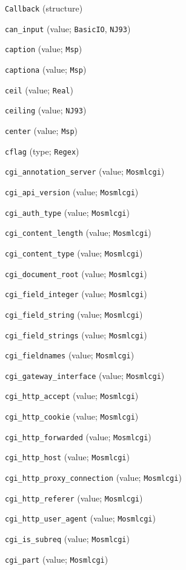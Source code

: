 \begin{description}
\item[] \verb"Callback" (structure)
\item[] \verb"can_input" (value; \verb"BasicIO", \verb"NJ93")
\item[] \verb"caption" (value; \verb"Msp")
\item[] \verb"captiona" (value; \verb"Msp")
\item[] \verb"ceil" (value; \verb"Real")
\item[] \verb"ceiling" (value; \verb"NJ93")
\item[] \verb"center" (value; \verb"Msp")
\item[] \verb"cflag" (type; \verb"Regex")
\item[] \verb"cgi_annotation_server" (value; \verb"Mosmlcgi")
\item[] \verb"cgi_api_version" (value; \verb"Mosmlcgi")
\item[] \verb"cgi_auth_type" (value; \verb"Mosmlcgi")
\item[] \verb"cgi_content_length" (value; \verb"Mosmlcgi")
\item[] \verb"cgi_content_type" (value; \verb"Mosmlcgi")
\item[] \verb"cgi_document_root" (value; \verb"Mosmlcgi")
\item[] \verb"cgi_field_integer" (value; \verb"Mosmlcgi")
\item[] \verb"cgi_field_string" (value; \verb"Mosmlcgi")
\item[] \verb"cgi_field_strings" (value; \verb"Mosmlcgi")
\item[] \verb"cgi_fieldnames" (value; \verb"Mosmlcgi")
\item[] \verb"cgi_gateway_interface" (value; \verb"Mosmlcgi")
\item[] \verb"cgi_http_accept" (value; \verb"Mosmlcgi")
\item[] \verb"cgi_http_cookie" (value; \verb"Mosmlcgi")
\item[] \verb"cgi_http_forwarded" (value; \verb"Mosmlcgi")
\item[] \verb"cgi_http_host" (value; \verb"Mosmlcgi")
\item[] \verb"cgi_http_proxy_connection" (value; \verb"Mosmlcgi")
\item[] \verb"cgi_http_referer" (value; \verb"Mosmlcgi")
\item[] \verb"cgi_http_user_agent" (value; \verb"Mosmlcgi")
\item[] \verb"cgi_is_subreq" (value; \verb"Mosmlcgi")
\item[] \verb"cgi_part" (value; \verb"Mosmlcgi")

\end{description}
